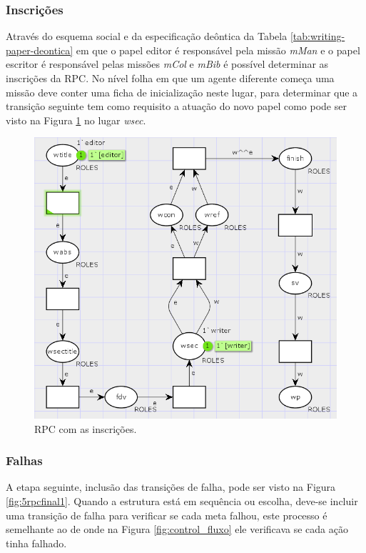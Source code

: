 \subsubsection{Inscrições}

Através do esquema social e da especificação deôntica da Tabela \ref{tab:writing-paper-deontica} em que o papel editor é responsável pela missão \textit{mMan} e o papel escritor é responsável pelas missões \textit{mCol} e \textit{mBib} é possível determinar as inscrições da RPC. No nível folha em que um agente diferente começa uma missão deve conter uma ficha de inicialização neste lugar, para determinar que a transição seguinte tem como requisito a atuação do novo papel como pode ser visto na Figura \ref{fig:5inscricao1} no lugar \textit{wsec}.

\begin{figure}[ht]
\centering
\includegraphics[scale=0.7]{imagens/5-inscricao1.png}
\caption{RPC com as inscrições.}
\label{fig:5inscricao1}
\end{figure}

\subsubsection{Falhas}

A etapa seguinte, inclusão das transições de falha, pode ser visto na Figura \ref{fig:5rpcfinal1}. Quando a estrutura está em sequência ou escolha, deve-se incluir uma transição de falha para verificar se cada meta falhou, este processo é semelhante ao de \cite{winikoff2017bdi} onde na Figura \ref{fig:control_fluxo} ele verificava se cada ação tinha falhado.


